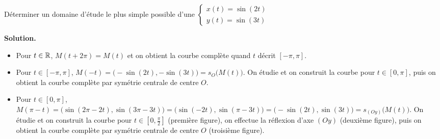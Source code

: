 \documentclass[class=report,crop=false]{standalone}
\begin{document}
\begin{exemple}
Déterminer un domaine d'étude le plus simple possible d'une 
$\left\{
\begin{array}{l}
x(t)=\sin(2t)\\
y(t)=\sin(3t)
\end{array}
\right.$

\medskip
\textbf{Solution.}

\begin{itemize}
  \item Pour $t\in\mathbb{R}$, $M(t+2\pi)=M(t)$ et on obtient la courbe
complète quand $t$ décrit $[-\pi,\pi]$.

  \item Pour $t\in[-\pi,\pi]$,
$M(-t)= \big(-\sin(2t),-\sin(3t)\big)=s_O\big(M(t)\big)$. On étudie et on
construit la courbe pour $t\in[0,\pi]$, puis on obtient
la courbe complète par
symétrie centrale de centre $O$.

  \item Pour $t\in[0,\pi]$,
$M(\pi-t)=\big(\sin(2\pi-2t),\sin(3\pi-3t)\big)=\big(\sin(-2t),\sin(\pi-3t)\big)
=\big(-\sin(2t),\sin(3t)\big)=s_{(Oy)}\big(M(t)\big)$.
On étudie et on construit la courbe pour
$t\in[0,\frac{\pi}{2}]$ (première figure),
on effectue la réflexion d'axe $(Oy)$ (deuxième figure),
puis on obtient la courbe complète par symétrie centrale de centre $O$ (troisième figure).
\end{itemize}


\end{exemple}
\end{document}
